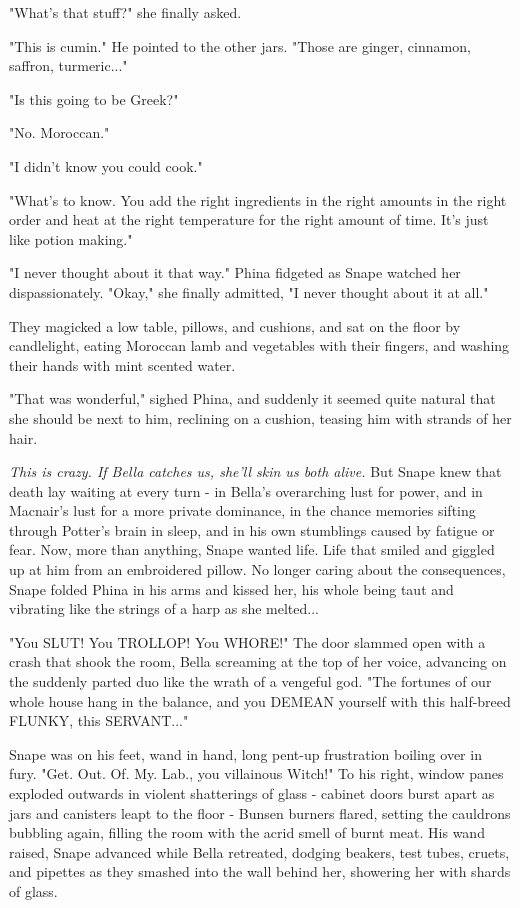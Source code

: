 "What's that stuff?" she finally asked.

"This is cumin." He pointed to the other jars. "Those are ginger, cinnamon, saffron, turmeric..."

"Is this going to be Greek?"

"No. Moroccan."

"I didn't know you could cook."

"What's to know. You add the right ingredients in the right amounts in the right order and heat at the right temperature for the right amount of time. It's just like potion making."

"I never thought about it that way." Phina fidgeted as Snape watched her dispassionately. "Okay," she finally admitted, "I never thought about it at all."

They magicked a low table, pillows, and cushions, and sat on the floor by candlelight, eating Moroccan lamb and vegetables with their fingers, and washing their hands with mint scented water.

"That was wonderful," sighed Phina, and suddenly it seemed quite natural that she should be next to him, reclining on a cushion, teasing him with strands of her hair.

\emph{This is crazy. If Bella catches us, she'll skin us both alive.} But Snape knew that death lay waiting at every turn - in Bella's overarching lust for power, and in Macnair's lust for a more private dominance, in the chance memories sifting through Potter's brain in sleep, and in his own stumblings caused by fatigue or fear. Now, more than anything, Snape wanted life. Life that smiled and giggled up at him from an embroidered pillow. No longer caring about the consequences, Snape folded Phina in his arms and kissed her, his whole being taut and vibrating like the strings of a harp as she melted...

"You SLUT! You TROLLOP! You WHORE!" The door slammed open with a crash that shook the room, Bella screaming at the top of her voice, advancing on the suddenly parted duo like the wrath of a vengeful god. "The fortunes of our whole house hang in the balance, and you DEMEAN yourself with this half-breed FLUNKY, this SERVANT..."

Snape was on his feet, wand in hand, long pent-up frustration boiling over in fury. "Get. Out. Of. My. Lab., you villainous Witch!" To his right, window panes exploded outwards in violent shatterings of glass - cabinet doors burst apart as jars and canisters leapt to the floor - Bunsen burners flared, setting the cauldrons bubbling again, filling the room with the acrid smell of burnt meat. His wand raised, Snape advanced while Bella retreated, dodging beakers, test tubes, cruets, and pipettes as they smashed into the wall behind her, showering her with shards of glass.

